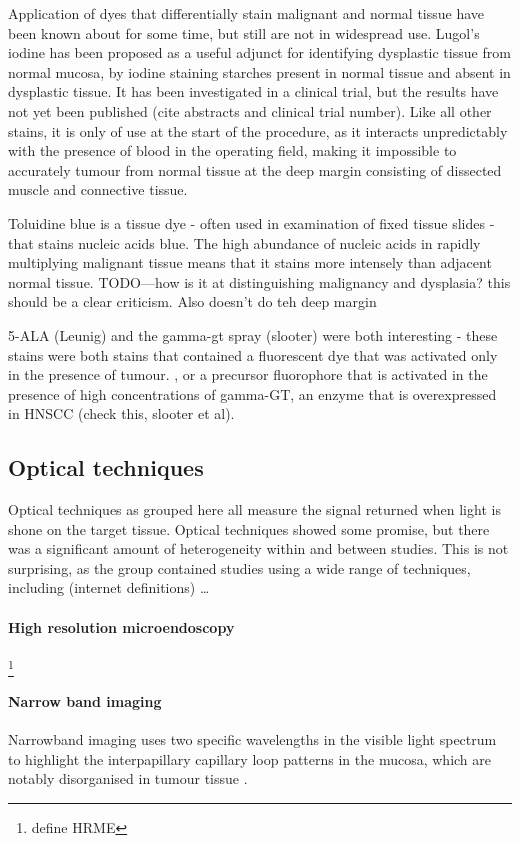 Application of dyes that differentially stain malignant and normal tissue have been known about for some time, but still are not in widespread use.
Lugol's iodine has been proposed as a useful adjunct for identifying dysplastic tissue from normal mucosa, by iodine staining starches present in normal tissue and absent in dysplastic tissue.
It has been investigated in a clinical trial, but the results have not yet been published (cite abstracts and clinical trial number).
Like all other stains, it is only of use at the start of the procedure, as it interacts unpredictably with the presence of blood in the operating field, making it impossible to accurately tumour from normal tissue at the deep margin consisting of dissected muscle and connective tissue.

Toluidine blue is a tissue dye - often used in examination of fixed tissue slides - that stains nucleic acids blue.
The high abundance of nucleic acids in rapidly multiplying malignant tissue means that it stains more intensely than adjacent normal tissue.
TODO---how is it at distinguishing malignancy and dysplasia? this should be a clear criticism. 
Also doesn't do teh deep margin

5-ALA (Leunig) and the gamma-gt spray (slooter) were both interesting - these stains were both stains that contained a fluorescent dye that was activated only in the presence of tumour. 
, or a precursor fluorophore that is activated in the presence of high concentrations of gamma-GT, an enzyme that is overexpressed in HNSCC (check this, slooter et al).

\subsection{Optical techniques}

Optical techniques as grouped here all measure the signal returned when light is shone on the target tissue.
Optical techniques showed some promise, but there was a significant amount of heterogeneity within and between studies. 
This is not surprising, as the group contained studies using a wide range of techniques, including (internet definitions) \ldots

\paragraph{High resolution microendoscopy} \cite{vilap.m.DiscriminationBenignNeoplastic2012, milesb.a.OperativeMarginControl2015}\footnote{define HRME}
\paragraph{Narrow band imaging} \cite{tirelliNarrowBandImaging2015, tirellig.TailoredResectionsOral2018}Narrowband imaging uses two specific wavelengths in the visible light spectrum to highlight the interpapillary capillary loop patterns in the mucosa, which are notably disorganised in tumour tissue \cite{vuEfficacyNarrowBand2014}.

